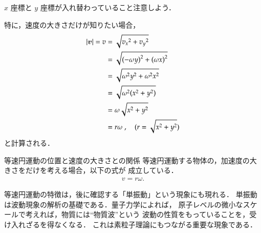                 $x$ 座標と $y$ 座標が入れ替わっていること注意しよう．

                    特に，速度の大きさだけが知りたい場合，
                    \begin{align*}
                        |\boldsymbol{v}| = v &= \sqrt{ {v_{x}}^{2}  +  {v_{y}}^{2} }   \\
                                    &= \sqrt{ {(-\omega y)}^{2}  +  {(\omega x)}^{2} }  \\
                                    &= \sqrt{ \omega^{2}y^{2}  +  \omega^{2}x^{2} } \\
                                    &= \sqrt{ \omega^{2} ( x^{2}  +  y^{2}) } \\
                                    &= \omega\sqrt{ x^{2}  +  y^{2} }\\
                                    &= r\omega \;,\quad ( r = \sqrt{ x^{2} + y^{2} } )
                    \end{align*}
                と計算される．
                    \begin{myshadebox}{等速円運動の位置と速度の大きさとの関係}
                        等速円運動する物体の，加速度の大きさをだけを考える場合，以下の式が
                        成立している．
                            \begin{align}
                                    v = r\omega.
                            \end{align}
                    \end{myshadebox}

            等速円運動の特徴は，後に確認する「単振動」という現象にも現れる．
            単振動は波動現象の解析の基礎である．量子力学によれば，
            原子レベルの微小なスケールで考えれば，物質には“物質波”という
            波動の性質をもっていることを，受け入れざるを得なくなる．
            これは素粒子理論にもつながる重要な現象である．

